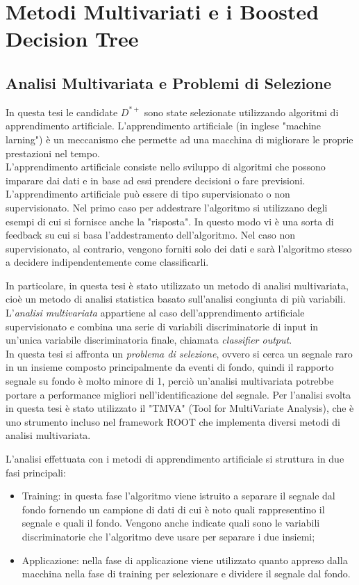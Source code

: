 \chapter{Metodi Multivariati e i Boosted Decision Tree}

\section{Analisi Multivariata e Problemi di Selezione} \label{AnalisiMulti}
In questa tesi le candidate $D^{*+}$ sono state selezionate utilizzando algoritmi di apprendimento artificiale. L'apprendimento artificiale (in inglese "machine larning") \`e un meccanismo che permette ad una macchina di migliorare le proprie prestazioni nel tempo. \cite{sitoMachineLearning}
\\L'apprendimento artificiale consiste nello sviluppo di algoritmi che possono imparare dai dati e in base ad essi prendere decisioni o fare previsioni. L'apprendimento artificiale può essere di tipo supervisionato o non supervisionato. Nel primo caso per addestrare l'algoritmo si utilizzano degli esempi di cui si fornisce anche la "risposta". In questo modo vi è una sorta di feedback su cui si basa l'addestramento dell'algoritmo. Nel caso non supervisionato, al contrario, vengono forniti solo dei dati e sarà l'algoritmo stesso a decidere indipendentemente come classificarli. 

In particolare, in questa tesi \`e stato utilizzato un metodo di analisi multivariata, cioè un metodo di analisi statistica basato sull'analisi congiunta di più variabili. L'\textit{analisi multivariata}  appartiene al caso dell'apprendimento artificiale supervisionato e combina una serie di variabili discriminatorie di input in un'unica variabile discriminatoria finale, chiamata \textit{classifier output}.
\\In questa tesi si affronta un \textit{problema di selezione}, ovvero si cerca un segnale raro in un insieme composto principalmente da eventi di fondo, quindi il rapporto segnale su fondo \`e molto minore di 1, perciò un'analisi multivariata potrebbe portare a performance migliori nell'identificazione del segnale.
Per l'analisi svolta in questa tesi \`e stato utilizzato il "TMVA" \cite{TMVA} (Tool for MultiVariate Analysis), che \`e uno strumento incluso nel framework ROOT\cite{Root} che implementa diversi metodi di analisi multivariata.

L'analisi effettuata con i metodi di apprendimento artificiale si struttura in due fasi principali:
    \begin{itemize}
        \item Training: in questa fase l'algoritmo viene istruito a separare il segnale dal fondo fornendo un campione di dati di cui è noto quali rappresentino il segnale e quali il fondo. Vengono anche indicate quali sono le variabili discriminatorie che l'algoritmo deve usare per separare i due insiemi;
        \item Applicazione: nella fase di applicazione viene utilizzato quanto appreso dalla macchina nella fase di training per selezionare e dividere il segnale dal fondo.
    \end{itemize}
    
